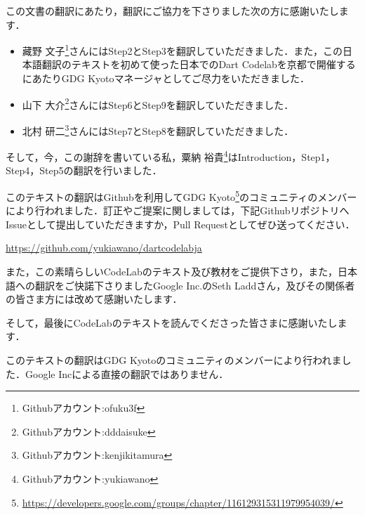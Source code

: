 
この文書の翻訳にあたり，翻訳にご協力を下さりました次の方に感謝いたします．

\begin{itemize}
\item 藏野 文子\footnote{Githubアカウント:ofuku3f}さんにはStep2とStep3を翻訳していただきました．また，この日本語翻訳のテキストを初めて使った日本でのDart Codelabを京都で開催するにあたりGDG Kyotoマネージャとしてご尽力をいただきました．
\item 山下 大介\footnote{Githubアカウント:dddaisuke}さんにはStep6とStep9を翻訳していただきました．
\item 北村 研二\footnote{Githubアカウント:kenjikitamura}さんにはStep7とStep8を翻訳していただきました．
\end{itemize}

そして，今，この謝辞を書いている私，粟納 裕貴\footnote{Githubアカウント:yukiawano}はIntroduction，Step1，Step4，Step5の翻訳を行いました．

このテキストの翻訳はGithubを利用してGDG Kyoto\footnote{\url{https://developers.google.com/groups/chapter/116129315311979954039/}}のコミュニティのメンバーにより行われました．訂正やご提案に関しましては，下記GithubリポジトリへIssueとして提出していただきますか，Pull Requestとしてぜひ送ってください．

\vspace{5mm}
\url{https://github.com/yukiawano/dartcodelabja}
\vspace{5mm}

また，この素晴らしいCodeLabのテキスト及び教材をご提供下さり，また，日本語への翻訳をご快諾下さりましたGoogle Inc.のSeth Laddさん，及びその関係者の皆さま方には改めて感謝いたします．

そして，最後にCodeLabのテキストを読んでくださった皆さまに感謝いたします．


このテキストの翻訳はGDG Kyotoのコミュニティのメンバーにより行われました．Google Incによる直接の翻訳ではありません．


